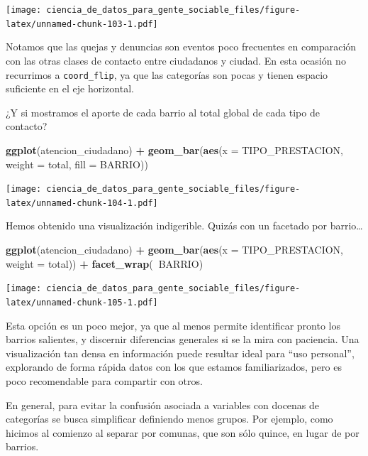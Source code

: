 \documentclass[spanish,]{book}
\newenvironment{Shaded}{\begin{snugshade}}{\end{snugshade}}
\newcommand{\DataTypeTok}[1]{\textcolor[rgb]{0.13,0.29,0.53}{#1}}
\newcommand{\KeywordTok}[1]{\textcolor[rgb]{0.13,0.29,0.53}{\textbf{#1}}}
\newcommand{\NormalTok}[1]{#1}
\newcommand{\OperatorTok}[1]{\textcolor[rgb]{0.81,0.36,0.00}{\textbf{#1}}}
\newcommand{\StringTok}[1]{\textcolor[rgb]{0.31,0.60,0.02}{#1}}
\begin{document}
\texttt{[image: ciencia\_de\_datos\_para\_gente\_sociable\_files/figure-latex/unnamed-chunk-103-1.pdf]}

Notamos que las quejas y denuncias son eventos poco frecuentes en comparación con las otras clases de contacto entre ciudadanos y ciudad. En esta ocasión no recurrimos a \texttt{coord\_flip}, ya que las categorías son pocas y tienen espacio suficiente en el eje horizontal.

¿Y si mostramos el aporte de cada barrio al total global de cada tipo de contacto?

\begin{Shaded}
\begin{Highlighting}[]
\KeywordTok{ggplot}\NormalTok{(atencion_ciudadano) }\OperatorTok{+}
\StringTok{    }\KeywordTok{geom_bar}\NormalTok{(}\KeywordTok{aes}\NormalTok{(}\DataTypeTok{x =}\NormalTok{ TIPO_PRESTACION, }\DataTypeTok{weight =}\NormalTok{ total, }\DataTypeTok{fill =}\NormalTok{ BARRIO)) }
\end{Highlighting}
\end{Shaded}

\texttt{[image: ciencia\_de\_datos\_para\_gente\_sociable\_files/figure-latex/unnamed-chunk-104-1.pdf]}

Hemos obtenido una visualización indigerible. Quizás con un facetado por barrio\ldots{}

\begin{Shaded}
\begin{Highlighting}[]
\KeywordTok{ggplot}\NormalTok{(atencion_ciudadano) }\OperatorTok{+}
\StringTok{    }\KeywordTok{geom_bar}\NormalTok{(}\KeywordTok{aes}\NormalTok{(}\DataTypeTok{x =}\NormalTok{ TIPO_PRESTACION, }\DataTypeTok{weight =}\NormalTok{ total)) }\OperatorTok{+}
\StringTok{    }\KeywordTok{facet_wrap}\NormalTok{(}\OperatorTok{~}\NormalTok{BARRIO)}
\end{Highlighting}
\end{Shaded}

\texttt{[image: ciencia\_de\_datos\_para\_gente\_sociable\_files/figure-latex/unnamed-chunk-105-1.pdf]}

Esta opción es un poco mejor, ya que al menos permite identificar pronto los barrios salientes, y discernir diferencias generales si se la mira con paciencia. Una visualización tan densa en información puede resultar ideal para ``uso personal'', explorando de forma rápida datos con los que estamos familiarizados, pero es poco recomendable para compartir con otros.

En general, para evitar la confusión asociada a variables con docenas de categorías se busca simplificar definiendo menos grupos. Por ejemplo, como hicimos al comienzo al separar por comunas, que son sólo quince, en lugar de por barrios.
\end{document}
